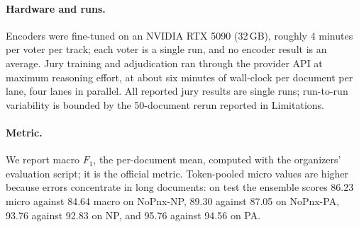 \documentclass[11pt]{article}
\begin{document}
\paragraph{Hardware and runs.}
Encoders were fine-tuned on an NVIDIA RTX 5090 (32\,GB), roughly 4 minutes per voter
per track; each voter is a single run, and no encoder result is an average. Jury
training and adjudication ran through the provider API at maximum reasoning effort, at
about six minutes of wall-clock per document per lane, four lanes in parallel. All
reported jury results are single runs; run-to-run variability is bounded by the
50-document rerun reported in Limitations.
\paragraph{Metric.} We report macro $F_1$, the per-document mean, computed with the
organizers' evaluation script; it is the official metric. Token-pooled micro values
are higher because errors concentrate in long documents: on test the ensemble scores
86.23 micro against 84.64 macro on NoPnx-NP, 89.30 against 87.05 on NoPnx-PA, 93.76
against 92.83 on NP, and 95.76 against 94.56 on PA.
\end{document}
